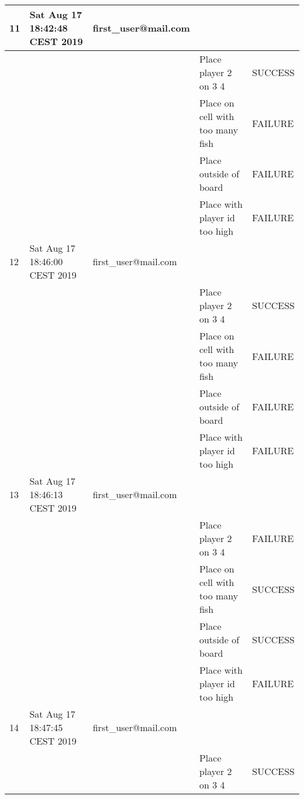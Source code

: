 \begin{center}
\begin{longtable}{|l|l|l|l|l|}
         11 &      Sat Aug 17 18:42:48 CEST 2019 & first\_user@mail.com &                                  &                 \\ \hline
         &      &                                 & Place player 2 on 3 4            & SUCCESS         \\ \hline
         &      &                                 & Place on cell with too many fish & FAILURE         \\ \hline
         &      &                                 & Place outside of board           & FAILURE         \\ \hline
         &      &                                 & Place with player id too high    & FAILURE         \\ \hline
         12 &      Sat Aug 17 18:46:00 CEST 2019 & first\_user@mail.com &                                  &                 \\ \hline
         &      &                                 & Place player 2 on 3 4            & SUCCESS         \\ \hline
         &      &                                 & Place on cell with too many fish & FAILURE         \\ \hline
         &      &                                 & Place outside of board           & FAILURE         \\ \hline
         &      &                                 & Place with player id too high    & FAILURE         \\ \hline
         13 &      Sat Aug 17 18:46:13 CEST 2019 & first\_user@mail.com &                                  &                 \\ \hline
         &      &                                 & Place player 2 on 3 4            & FAILURE         \\ \hline
         &      &                                 & Place on cell with too many fish & SUCCESS         \\ \hline
         &      &                                 & Place outside of board           & SUCCESS         \\ \hline
         &      &                                 & Place with player id too high    & FAILURE         \\ \hline
         14 &      Sat Aug 17 18:47:45 CEST 2019 & first\_user@mail.com &                                  &                 \\ \hline
         &      &                                 & Place player 2 on 3 4            & SUCCESS         \\ \hline

\end{longtable}
\end{center}
